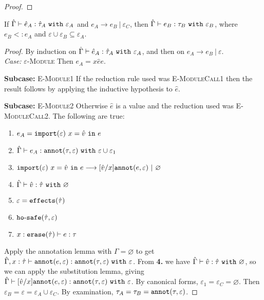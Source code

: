 \begin{appendix}
\begin{proof}
\end{proof}

\hrulefill

\begin{theorem}[Preservation]
If $\hat \Gamma \vdash \hat e_A: \hat \tau_A~\mathtt{with}~ \varepsilon_A$ and $e_A \longrightarrow e_B~|~\varepsilon_C$, then $\hat \Gamma \vdash e_B: \tau_B~\mathtt{with}~ \varepsilon_B$, where $e_B <: e_A$ and $\varepsilon \cup \varepsilon_B \subseteq \varepsilon_A$.
\end{theorem}

\begin{proof}
By induction on $\hat \Gamma \vdash \hat e_A: \hat \tau_A~\mathtt{with}~ \varepsilon_A$, and then on $e_A \longrightarrow e_B~|~\varepsilon$. \\

\textit{Case:} \textsc{$\varepsilon$-Module}
Then $e_A = {x}{\hat e}{e}$.

\textbf{Subcase:} \textsc{E-Module1} If the reduction rule used was \textsc{E-ModuleCall1} then the result follows by applying the inductive hypothesis to $\hat e$.

\textbf{Subcase:} \textsc{E-Module2} Otherwise $\hat e$ is a value and the reduction used was \textsc{E-ModuleCall2}. The following are true:
\begin{enumerate}
	\setlength\itemsep{-0.7em}
	\item $e_A = \mathtt{import}(\varepsilon)~x = \hat v~\mathtt{in}~ e$
	\item $\hat \Gamma \vdash e_A: \mathtt{annot}(\tau, \varepsilon)~\mathtt{with}~ \varepsilon \cup \varepsilon_1$
	\item $\mathtt{import}(\varepsilon)~x = \hat v~\mathtt{in}~ e \longrightarrow [\hat v/x]\mathtt{annot}(e, \varepsilon)~|~\varnothing$
	\item $\hat \Gamma \vdash \hat v: \hat \tau~\mathtt{with}~ \varnothing$
	\item $\varepsilon = \mathtt{effects}(\hat \tau)$
	\item $\mathtt{ho \hbox{-} safe}(\hat \tau, \varepsilon)$
	\item $x: \mathtt{erase}(\hat \tau) \vdash e: \tau$
\end{enumerate}

Apply the annotation lemma with $\Gamma = \varnothing$ to get $\hat \Gamma, x: \hat \tau \vdash \mathtt{annot}(e, \varepsilon): \mathtt{annot}(\tau, \varepsilon)~\mathtt{with}~ \varepsilon$. From \textbf{4.} we have $\hat \Gamma \vdash \hat v: \hat \tau~\mathtt{with}~ \varnothing$, so we can apply the substitution lemma, giving $\hat \Gamma \vdash [\hat v/x]\mathtt{annot}(e, \varepsilon): \mathtt{annot}(\tau, \varepsilon)~\mathtt{with}~ \varepsilon$. By canonical forms, $\varepsilon_1 = \varepsilon_C = \varnothing$. Then $\varepsilon_B = \varepsilon = \varepsilon_A \cup \varepsilon_C$. By examination, $\tau_A = \tau_B = \mathtt{annot}(\tau, \varepsilon)$.


\end{proof}
\end{appendix}
